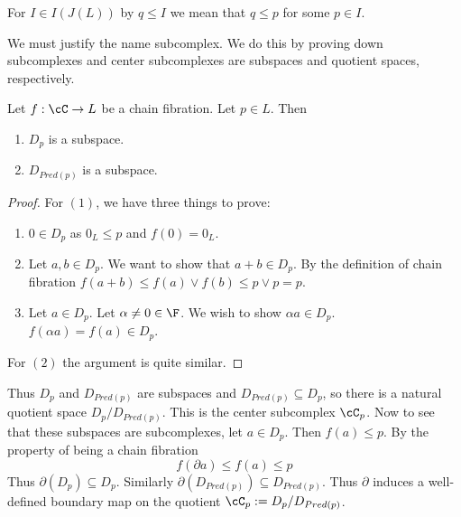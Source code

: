 \begin{defn}
For $I\in I(J(L))$ by $q\leq I$ we mean that $q\leq p$ for some $p\in I$.
\end{defn}
%
%


We must justify the name subcomplex.  We do this by proving down subcomplexes and center subcomplexes are subspaces and quotient spaces, respectively.

\begin{prop}
Let $f:\cC\to L$ be a chain fibration.  Let $p\in L$.  Then
\begin{enumerate}
\item $D_p$ is a subspace.  
\item $D_{Pred(p)}$ is a subspace.  
\end{enumerate}
\end{prop}
\begin{proof}
For $(1)$, we have three things to prove:
\begin{enumerate}
\item $0\in D_p$ as $0_L \leq p$ and $f(0)=0_L$.
\item Let $a,b\in D_p$. We want to show that $a+b\in D_p$.  By the definition of chain fibration $f(a+b)\leq f(a)\vee f(b)\leq p \vee p = p$.
\item Let $a\in D_p$.  Let $\alpha\neq 0\in \F$.  We wish to show $\alpha a\in D_p$. $f(\alpha a) = f(a) \in D_p$.
\end{enumerate}

For $(2)$ the argument is quite similar.
\end{proof}

Thus $D_p$ and $D_{Pred(p)}$ are subspaces and $D_{Pred(p)}\subseteq D_p$, so there is a natural quotient space $D_p/D_{Pred(p)}$.  This is the center subcomplex $\cC_p$.  Now to see that these subspaces are subcomplexes, let $a\in D_p$.  Then $f(a)\leq p$.  By the property of being a chain fibration $$f(\partial a) \leq f(a) \leq p$$  Thus $\partial(D_p)\subseteq D_p$. Similarly $\partial(D_{Pred(p)})\subseteq D_{Pred(p)}$. Thus $\partial$ induces a well-defined boundary map on the quotient $\cC_p := D_p/D_{Pred(p)}$.




